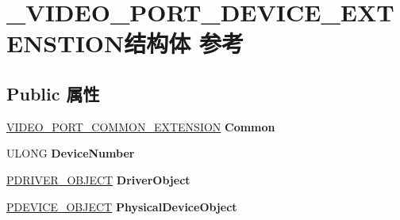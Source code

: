 \hypertarget{struct___v_i_d_e_o___p_o_r_t___d_e_v_i_c_e___e_x_t_e_n_s_t_i_o_n}{}\section{\+\_\+\+V\+I\+D\+E\+O\+\_\+\+P\+O\+R\+T\+\_\+\+D\+E\+V\+I\+C\+E\+\_\+\+E\+X\+T\+E\+N\+S\+T\+I\+O\+N结构体 参考}
\label{struct___v_i_d_e_o___p_o_r_t___d_e_v_i_c_e___e_x_t_e_n_s_t_i_o_n}
\subsection*{Public 属性}
\begin{DoxyCompactItemize}
\item 
\mbox{\label{struct___v_i_d_e_o___p_o_r_t___d_e_v_i_c_e___e_x_t_e_n_s_t_i_o_n_a9281e491a69e2f8b7413ae9d3e7cade2}} 
\hyperlink{struct___v_i_d_e_o___p_o_r_t___c_o_m_m_o_n___e_x_t_e_n_s_i_o_n}{V\+I\+D\+E\+O\+\_\+\+P\+O\+R\+T\+\_\+\+C\+O\+M\+M\+O\+N\+\_\+\+E\+X\+T\+E\+N\+S\+I\+ON} {\bfseries Common}
\item 
\mbox{\label{struct___v_i_d_e_o___p_o_r_t___d_e_v_i_c_e___e_x_t_e_n_s_t_i_o_n_a948a49607ee3b42d3b0e2c7ddb35d997}} 
U\+L\+O\+NG {\bfseries Device\+Number}
\item 
\mbox{\label{struct___v_i_d_e_o___p_o_r_t___d_e_v_i_c_e___e_x_t_e_n_s_t_i_o_n_aac780140fed22725ecf80b54ef1b0c2b}} 
\hyperlink{struct___d_r_i_v_e_r___o_b_j_e_c_t}{P\+D\+R\+I\+V\+E\+R\+\_\+\+O\+B\+J\+E\+CT} {\bfseries Driver\+Object}
\item 
\mbox{\label{struct___v_i_d_e_o___p_o_r_t___d_e_v_i_c_e___e_x_t_e_n_s_t_i_o_n_a0b56c50591a882da75dd023e06d13d3f}} 
\hyperlink{struct___d_e_v_i_c_e___o_b_j_e_c_t}{P\+D\+E\+V\+I\+C\+E\+\_\+\+O\+B\+J\+E\+CT} {\bfseries Physical\+Device\+Object}
\item 
\mbox{\label{struct___v_i_d_e_o___p_o_r_t___d_e_v_i_c_e___e_x_t_e_n_s_t_i_o_n_ae01e142977109bf08caa599ea51a05ce}} 

\end{DoxyCompactItemize}
